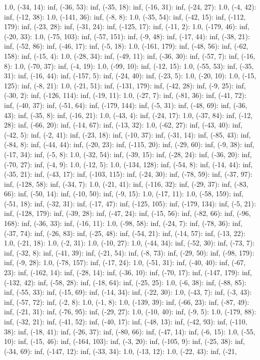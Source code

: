 \documentclass[parskip=half]{scrartcl}
\begin{document}
1.0, (-34, 14): inf, (-36, 53): inf, (-35, 18): inf, (-16, 31): inf, (-24, 27): 1.0, (-4, 42): inf, (-12, 38): 1.0, (-141, 36): inf, (-8, 8): 1.0, (-35, 54): inf, (-42, 15): inf, (-112, 179): inf, (-23, 28): inf, (-31, 24): inf, (-125, 17): inf, (-11, 2): 1.0, (-179, 46): inf, (-20, 33): 1.0, (-75, 103): inf, (-57, 151): inf, (-9, 48): inf, (-17, 44): inf, (-38, 21): inf, (-52, 86): inf, (-46, 17): inf, (-5, 18): 1.0, (-161, 179): inf, (-48, 56): inf, (-62, 158): inf, (-15, 4): 1.0, (-28, 34): inf, (-49, 11): inf, (-36, 30): inf, (-57, 7): inf, (-16, 8): 1.0, (-70, 37): inf, (-4, 19): 1.0, (-99, 10): inf, (-12, 15): 1.0, (-55, 53): inf, (-35, 31): inf, (-16, 44): inf, (-157, 5): inf, (-24, 40): inf, (-23, 5): 1.0, (-20, 10): 1.0, (-15, 125): inf, (-8, 21): 1.0, (-21, 51): inf, (-131, 179): inf, (-42, 28): inf, (-9, 25): inf, (-30, 2): inf, (-126, 114): inf, (-19, 11): 1.0, (-27, 7): inf, (-81, 36): inf, (-41, 72): inf, (-40, 37): inf, (-51, 64): inf, (-179, 144): inf, (-5, 31): inf, (-48, 69): inf, (-36, 43): inf, (-35, 8): inf, (-16, 21): 1.0, (-43, 4): inf, (-24, 17): 1.0, (-37, 84): inf, (-12, 28): inf, (-66, 20): inf, (-14, 67): inf, (-13, 32): 1.0, (-62, 27): inf, (-43, 40): inf, (-42, 5): inf, (-2, 41): inf, (-23, 18): inf, (-10, 37): inf, (-31, 14): inf, (-85, 43): inf, (-84, 8): inf, (-44, 44): inf, (-20, 23): inf, (-115, 20): inf, (-29, 60): inf, (-9, 38): inf, (-17, 34): inf, (-5, 8): 1.0, (-32, 54): inf, (-39, 15): inf, (-28, 24): inf, (-36, 20): inf, (-70, 27): inf, (-4, 9): 1.0, (-12, 5): 1.0, (-134, 128): inf, (-54, 8): inf, (-14, 44): inf, (-35, 21): inf, (-43, 17): inf, (-103, 115): inf, (-24, 30): inf, (-78, 59): inf, (-37, 97): inf, (-128, 58): inf, (-34, 7): 1.0, (-21, 41): inf, (-116, 32): inf, (-29, 37): inf, (-83, 66): inf, (-50, 14): inf, (-10, 50): inf, (-9, 15): 1.0, (-17, 11): 1.0, (-58, 159): inf, (-51, 18): inf, (-32, 31): inf, (-17, 47): inf, (-125, 105): inf, (-179, 134): inf, (-5, 21): inf, (-128, 179): inf, (-39, 28): inf, (-47, 24): inf, (-15, 56): inf, (-82, 66): inf, (-96, 168): inf, (-36, 33): inf, (-16, 11): 1.0, (-98, 58): inf, (-24, 7): inf, (-78, 36): inf, (-37, 74): inf, (-26, 83): inf, (-25, 48): inf, (-54, 21): inf, (-14, 57): inf, (-13, 22): 1.0, (-21, 18): 1.0, (-2, 31): 1.0, (-10, 27): 1.0, (-44, 34): inf, (-52, 30): inf, (-73, 7): inf, (-32, 8): inf, (-41, 39): inf, (-21, 54): inf, (-8, 73): inf, (-29, 50): inf, (-98, 179): inf, (-9, 28): 1.0, (-78, 157): inf, (-17, 24): 1.0, (-51, 31): inf, (-40, 40): inf, (-67, 23): inf, (-162, 14): inf, (-28, 14): inf, (-36, 10): inf, (-70, 17): inf, (-147, 179): inf, (-132, 42): inf, (-58, 28): inf, (-18, 64): inf, (-25, 25): 1.0, (-6, 38): inf, (-88, 85): inf, (-55, 33): inf, (-15, 69): inf, (-14, 34): inf, (-22, 30): 1.0, (-43, 7): inf, (-3, 43): inf, (-57, 72): inf, (-2, 8): 1.0, (-1, 8): 1.0, (-139, 39): inf, (-66, 23): inf, (-87, 49): inf, (-21, 31): inf, (-76, 95): inf, (-29, 27): 1.0, (-10, 40): inf, (-9, 5): 1.0, (-179, 88): inf, (-32, 21): inf, (-41, 52): inf, (-40, 17): inf, (-48, 13): inf, (-42, 93): inf, (-110, 38): inf, (-18, 41): inf, (-26, 37): inf, (-80, 66): inf, (-47, 14): inf, (-6, 15): 1.0, (-55, 10): inf, (-15, 46): inf, (-164, 103): inf, (-3, 20): inf, (-105, 9): inf, (-25, 38): inf, (-34, 69): inf, (-147, 12): inf, (-33, 34): 1.0, (-13, 12): 1.0, (-22, 43): inf, (-21, 
\end{document}
